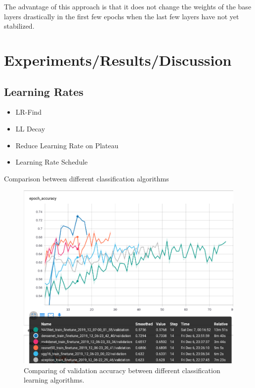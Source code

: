 \documentclass{article}
\begin{document}
The advantage of this approach is that it does not change the weights of the base layers drastically in the first few epochs when the last few layers have not yet stabilized. 

\section{Experiments/Results/Discussion}

\subsection{Learning Rates}

\begin{itemize}
    \item LR-Find
    \item LL Decay
    \item Reduce Learning Rate on Plateau
    \item Learning Rate Schedule
    
\end{itemize}

Comparison between different classification algorithms

\begin{figure}
    \centering
    \includegraphics[width=\linewidth]{data/images/05_Comparision/Classification_plot.png}
    \caption{Comparing of validation accuracy between different classification learning algorithms. \cite{Zoph_2018}  \cite{Huang_2017} \cite{howard2017mobilenets} \cite{he2016deep} \cite{simonyan2014deep} \cite{chollet2017xception} }
    \label{fig:my_label}
\end{figure}
\end{document}
